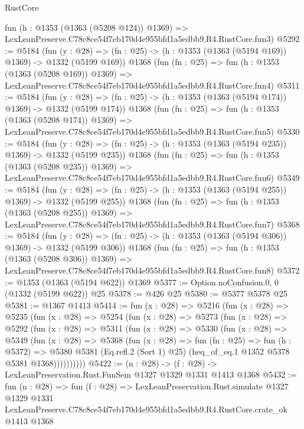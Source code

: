 \begin{lexlean}{RustCore}
\begin{coremodule}
    fun (h : @1353 (@1363 (@5208 @124)) @1369) =>
    LexLeanPreserve.C78c8ce54f7eb170d4e955bfd1a5edbb9.R4.RustCore.fun3)
@5292 := @5184
    (fun (y : @28) => (fn : @25) -> (h : @1353 (@1363 (@5194 @169)) @1369) -> @1332 (@5199 @169))
    @1368
    (fun (fn : @25) =>
    fun (h : @1353 (@1363 (@5208 @169)) @1369) =>
    LexLeanPreserve.C78c8ce54f7eb170d4e955bfd1a5edbb9.R4.RustCore.fun4)
@5311 := @5184
    (fun (y : @28) => (fn : @25) -> (h : @1353 (@1363 (@5194 @174)) @1369) -> @1332 (@5199 @174))
    @1368
    (fun (fn : @25) =>
    fun (h : @1353 (@1363 (@5208 @174)) @1369) =>
    LexLeanPreserve.C78c8ce54f7eb170d4e955bfd1a5edbb9.R4.RustCore.fun5)
@5330 := @5184
    (fun (y : @28) => (fn : @25) -> (h : @1353 (@1363 (@5194 @235)) @1369) -> @1332 (@5199 @235))
    @1368
    (fun (fn : @25) =>
    fun (h : @1353 (@1363 (@5208 @235)) @1369) =>
    LexLeanPreserve.C78c8ce54f7eb170d4e955bfd1a5edbb9.R4.RustCore.fun6)
@5349 := @5184
    (fun (y : @28) => (fn : @25) -> (h : @1353 (@1363 (@5194 @255)) @1369) -> @1332 (@5199 @255))
    @1368
    (fun (fn : @25) =>
    fun (h : @1353 (@1363 (@5208 @255)) @1369) =>
    LexLeanPreserve.C78c8ce54f7eb170d4e955bfd1a5edbb9.R4.RustCore.fun7)
@5368 := @5184
    (fun (y : @28) => (fn : @25) -> (h : @1353 (@1363 (@5194 @306)) @1369) -> @1332 (@5199 @306))
    @1368
    (fun (fn : @25) =>
    fun (h : @1353 (@1363 (@5208 @306)) @1369) =>
    LexLeanPreserve.C78c8ce54f7eb170d4e955bfd1a5edbb9.R4.RustCore.fun8)
@5372 := @1353 (@1363 (@5194 @622)) @1369
@5377 := Option.noConfusion.{0, 0} (@1332 (@5199 @622)) @25
@5378 := @426 @25
@5380 := @5377 @5378 @25
@5381 := @1367 @1413
@5414 := fun (x : @28) =>
  @5216
    (fun (x : @28) =>
    @5235
      (fun (x : @28) =>
      @5254
        (fun (x : @28) =>
        @5273
          (fun (x : @28) =>
          @5292
            (fun (x : @28) =>
            @5311
              (fun (x : @28) =>
              @5330
                (fun (x : @28) =>
                @5349
                  (fun (x : @28) =>
                  @5368
                    (fun (x : @28) =>
                    fun (fn : @25) =>
                    fun (h : @5372) =>
                    @5380
                      @5381
                      (Eq.refl.{2} (Sort 1) @25)
                      (heq_of_eq.{1} @1352 @5378 @5381 @1368))))))))))
@5422 := (n : @28) -> (f : @28) -> LexLeanPreservation.Rust.FunSem @1327 @1329 @1331 @1413 @1368
@5432 := fun (n : @28) =>
  fun (f : @28) =>
  LexLeanPreservation.Rust.simulate
    @1327
    @1329
    @1331
    LexLeanPreserve.C78c8ce54f7eb170d4e955bfd1a5edbb9.R4.RustCore.crate_ok
    @1413
    @1368
\end{coremodule}
\end{lexlean}
